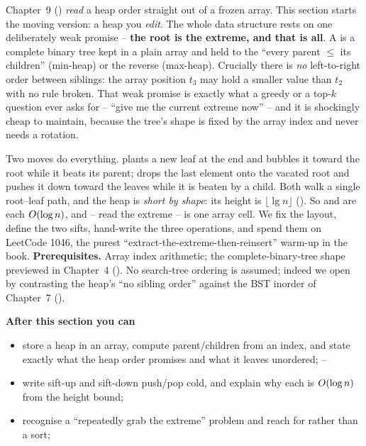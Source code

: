 \begin{topicintro}
Chapter~9 () \emph{read} a heap order straight out of a frozen array. This section starts the
moving version: a heap you \emph{edit}. The whole data structure rests on one deliberately weak promise
-- \textbf{the root is the extreme, and that is all}. A  is a complete binary tree kept
in a plain array and held to the  ``every parent $\le$ its children'' (min-heap) or the
reverse (max-heap). Crucially there is \emph{no} left-to-right order between siblings: the array position
$t_3$ may hold a smaller value than $t_2$ with no rule broken. That weak promise is exactly what a greedy
or a top-$k$ question ever asks for -- ``give me the current extreme now'' -- and it is shockingly cheap
to maintain, because the tree's shape is fixed by the array index and never needs a rotation.

Two moves do everything.  plants a new leaf at the end and bubbles it toward the root while
it beats its parent;  drops the last element onto the vacated root and pushes it down
toward the leaves while it is beaten by a child. Both walk a single root--leaf path, and the heap is
\emph{short by shape}: its height is $\lfloor\lg n\rfloor$ (). So  and
 are each $O(\log n)$, and  -- read the extreme -- is one array cell. We fix the
layout, define the two sifts, hand-write the three operations, and spend them on LeetCode 1046, the
purest ``extract-the-extreme-then-reinsert'' warm-up in the book.
\textbf{Prerequisites.} Array index arithmetic; the complete-binary-tree shape previewed in Chapter~4
(). No search-tree ordering is assumed; indeed we open by contrasting the heap's ``no sibling
order'' against the BST inorder of Chapter~7 ().

\textbf{After this section you can}
\begin{itemize}[nosep]
  \item store a heap in an array, compute parent/children from an index, and state exactly what the heap
        order promises and what it leaves unordered; \hfill{}--
  \item write sift-up and sift-down push/pop cold, and explain why each is $O(\log n)$ from the height
        bound; \hfill{}
  \item recognise a ``repeatedly grab the extreme'' problem and reach for  rather
        than a sort; \hfill{}
\end{itemize}
\end{topicintro}

